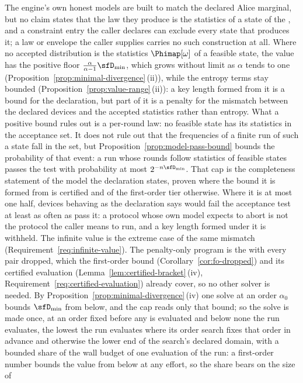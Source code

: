 The engine's own honest models are built to match the declared Alice
marginal, but no claim states that the law they produce is the statistics of
a state of the , and a constraint entry the caller declares
can exclude every state that produces it; a law or envelope the caller
supplies carries no such construction at all. Where no accepted distribution
is the statistics $\Phimap[\omega]$ of a feasible state, the value has the
positive floor $\frac{\alpha}{\alpha-1}\sfD_{\min}$, which grows without limit
as $\alpha$ tends to one (Proposition~\ref{prop:minimal-divergence}\,(ii)),
while the entropy terms stay bounded
(Proposition~\ref{prop:value-range}\,(ii)): a key length formed from it is a
bound for the declaration, but part of it is a penalty for the mismatch
between the declared devices and the accepted statistics rather than
entropy. What a positive bound rules out is a per-round law: no feasible
state has its statistics in the acceptance set. It does not rule out that
the frequencies of a finite run of such a state fall in the set, but
Proposition~\ref{prop:model-pass-bound} bounds the probability of that
event: a run whose rounds follow statistics of feasible states passes the
test with probability at most $2^{-n\sfD_{\min}}$. That cap is the
completeness statement of the model the declaration states, proven where
the bound it is formed from is certified and of the first-order tier
otherwise. Where it is at most one half, devices behaving as the
declaration says would fail the acceptance test at least as often as pass
it: a protocol whose own model
expects to abort is not the protocol the caller means to run, and a key
length formed under it is withheld. The infinite value is
the extreme case of the same mismatch
(Requirement~\ref{req:infinite-value}). The penalty-only program is the
 with every pair dropped, which the first-order bound
(Corollary~\ref{cor:fo-dropped}) and its certified evaluation
(Lemma~\ref{lem:certified-bracket}\,(iv),
Requirement~\ref{req:certified-evaluation}) already cover, so no other
solver is needed. By Proposition~\ref{prop:minimal-divergence}\,(iv) one
solve at an order $\alpha_0$ bounds $\sfD_{\min}$ from below, and the cap
reads only that bound; so the solve is made once, at
an order fixed before any is evaluated and below none the run evaluates, the
lowest the run evaluates where its order search fixes that order in advance
and otherwise the lower end of the search's declared domain, with a bounded
share of the wall budget of one evaluation of the run: a first-order number
bounds the value from below at any effort, so the share bears on the size of
